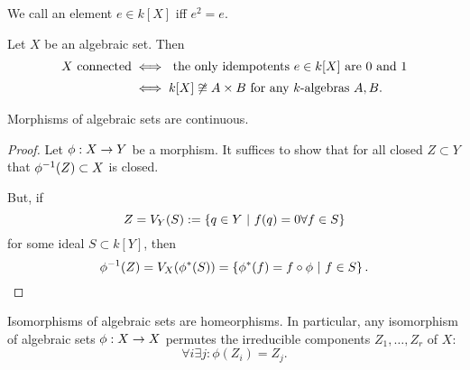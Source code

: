 \begin{lemma}
	We call an element $e \in k[X]$  iff $e^2 = e$.
	
	Let $X$ be an algebraic set. Then
	\begin{align*}
	X \text{ connected} &\iff \text{ the only idempotents }e \in k[X] \text{ are 0 and 1}\\
	&\iff k[X] \not\overset{}{\cong} A \times B \text{ for any }k\text{-algebras }A,B.
	\end{align*}
\end{lemma}
\begin{lemma}
	Morphisms of algebraic sets are continuous.
\end{lemma}
\begin{proof}
	Let $\phi : X \overset{}{\rightarrow} Y$ be a morphism.
	It suffices to show that for all closed $Z \subset Y$ that $\phi^{-1}(Z) \subset X$ is closed.
	
	But, if
	\[Z = V_Y(S) := \left\lbrace q \in Y ~ | ~ f(q) = 0 \forall f \in S\right\rbrace\]
	 for some ideal $S \subset k[Y]$, then 
	 \[\phi^{-1}(Z) = V_X(\phi^*(S)) = \left\lbrace\phi^*(f) = f \circ \phi ~ | ~ f \in S\right\rbrace.\]
\end{proof}
\begin{lemma}
	Isomorphisms of algebraic sets are homeorphisms. In particular, any isomorphism of algebraic sets $\phi : X \overset{}{\rightarrow} X$ permutes the irreducible components $Z_1, \ldots, Z_r$ of $X$:
	\[ \forall i \exists j: \phi(Z_i) = Z_j. \]
\end{lemma}

